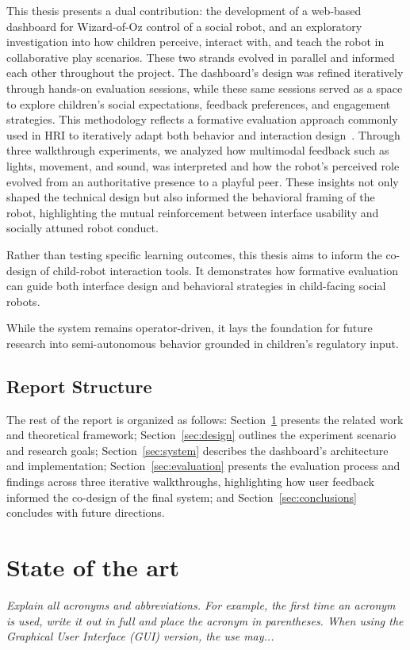 \documentclass[a4paper]{usiinfbachelorproject}
\begin{document}
This thesis presents a dual contribution: the development of a web-based dashboard for Wizard-of-Oz control of a social robot, and an exploratory investigation into how children perceive, interact with, and teach the robot in collaborative play scenarios.
These two strands evolved in parallel and informed each other throughout the project.
The dashboard's design was refined iteratively through hands-on evaluation sessions, while these same sessions served as a space to explore children's social expectations, feedback preferences, and engagement strategies.
This methodology reflects a formative evaluation approach commonly used in HRI to iteratively adapt both behavior and interaction design~\cite{love2024teachable}.
Through three walkthrough experiments, we analyzed how multimodal feedback such as lights, movement, and sound, was interpreted and how the robot's perceived role evolved from an authoritative presence to a playful peer.
These insights not only shaped the technical design but also informed the behavioral framing of the robot, highlighting the mutual reinforcement between interface usability and socially attuned robot conduct.

Rather than testing specific learning outcomes, this thesis aims to inform the co-design of child-robot interaction tools.
It demonstrates how formative evaluation can guide both interface design and behavioral strategies in child-facing social robots.

While the system remains operator-driven, it lays the foundation for future research into semi-autonomous behavior grounded in children's regulatory input.

\subsection{\textbf{Report Structure}}
The rest of the report is organized as follows: Section~\ref{sec:background} presents the related work and theoretical framework; Section~\ref{sec:design} outlines the experiment scenario and research goals; Section~\ref{sec:system} describes the dashboard's architecture and implementation; Section~\ref{sec:evaluation} presents the evaluation process and findings across three iterative walkthroughs, highlighting how user feedback informed the co-design of the final system; and Section~\ref{sec:conclusions} concludes with future directions.


\section{\textbf{State of the art}}\label{sec:background}
\textit{
    Explain all acronyms and abbreviations. For example, the first time an acronym is used, write it out in full and place the acronym in
    parentheses. When using the Graphical User Interface (GUI) version, the use may...
}
\end{document}
